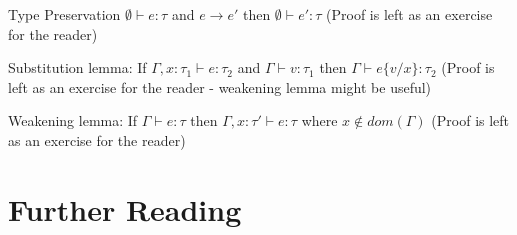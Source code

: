 Type Preservation
$\emptyset\vdash e : \tau$ and $e \longrightarrow e'$ then $\emptyset\vdash e' : \tau$
(Proof is left as an exercise for the reader)

Substitution lemma:
If $\Gamma, x:\tau_1 \vdash e : \tau_2$ and $\Gamma\vdash v : \tau_1$
then $\Gamma\vdash e\{v/x\} : \tau_2$
(Proof is left as an exercise for the reader - weakening lemma might be useful)

Weakening lemma:
If $\Gamma\vdash e : \tau$ then $\Gamma, x:\tau' \vdash e : \tau$ where $x\not\in dom(\Gamma)$
(Proof is left as an exercise for the reader)

\section{Further Reading}
